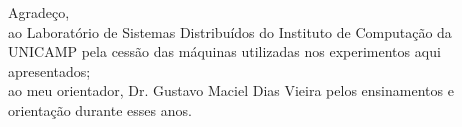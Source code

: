 \begin{agradecimentos}

	\noindent Agradeço,\\[2mm]
  ao Laboratório de Sistemas Distribuídos do Instituto de Computação da UNICAMP pela
  cessão das máquinas utilizadas nos experimentos aqui apresentados;\\[2mm]
  ao meu orientador, Dr. Gustavo Maciel Dias Vieira pelos ensinamentos e orientação
  durante esses anos.

\end{agradecimentos}
